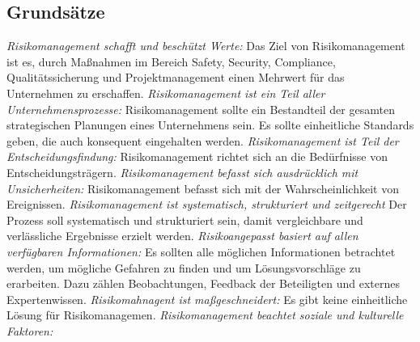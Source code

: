 \documentclass{report}
\begin{document}
\subsection{Grundsätze}
\emph{Risikomanagement schafft und beschützt Werte:}
\newline
Das Ziel von Risikomanagement ist es, durch Maßnahmen im Bereich Safety, Security, Compliance, Qualitätssicherung und Projektmanagement einen Mehrwert für das Unternehmen zu erschaffen.
\newline
\newline
\emph{Risikomanagement ist ein Teil aller Unternehmensprozesse:}
\newline
Risikomanagement sollte ein Bestandteil der gesamten strategischen Planungen eines Unternehmens sein. Es sollte einheitliche Standards geben, die auch konsequent eingehalten werden. 
\newline
\newline
\emph{Risikomanagement ist Teil der Entscheidungsfindung:}
\newline
Risikomanagement richtet sich an die Bedürfnisse von Entscheidungsträgern. 
\newline
\newline
\emph{Risikomanagement befasst sich ausdrücklich mit Unsicherheiten:}
\newline
Risikomanagement befasst sich mit der Wahrscheinlichkeit von Ereignissen.
\newline
\newline
\emph{Risikomanagement ist systematisch, strukturiert und zeitgerecht}
\newline
Der Prozess soll systematisch und strukturiert sein, damit vergleichbare und verlässliche Ergebnisse erzielt werden.
\newline
\newline
\emph{Risikoangepasst basiert auf allen verfügbaren Informationen:}
\newline
Es sollten alle möglichen Informationen betrachtet werden, um mögliche Gefahren zu finden und um Lösungsvorschläge zu erarbeiten. Dazu zählen Beobachtungen,  Feedback der Beteiligten und externes Expertenwissen. 
\newline
\newline
\emph{Risikomahnagent ist maßgeschneidert:}
\newline
Es gibt keine einheitliche Lösung für Risikomanagemen\cite{Klipper}.
\newline
\newline
\emph{Risikomanagement beachtet soziale und kulturelle Faktoren:}
\end{document}
